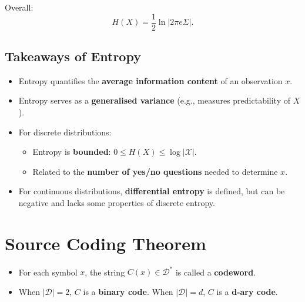 Overall:
\[
H(X) = \frac{1}{2} \ln |2 \pi e \Sigma|.
\]

\subsection{Takeaways of Entropy}
\begin{itemize}
    \item Entropy quantifies the \textbf{average information content} of an observation \(x\).
    \item Entropy serves as a \textbf{generalised variance} (e.g., measures predictability of \(X\)).
    \item For discrete distributions:
    \begin{itemize}
        \item Entropy is \textbf{bounded}: \(0 \leq H(X) \leq \log |\mathcal{X}|\).
        \item Related to the \textbf{number of yes/no questions} needed to determine \(x\).
    \end{itemize}
    \item For continuous distributions, \textbf{differential entropy} is defined, but can be negative and lacks some properties of discrete entropy.
\end{itemize}

\section{Source Coding Theorem}


\begin{itemize}
    \item For each symbol \( x \), the string \( C(x) \in \mathcal{D}^* \) is called a \textbf{codeword}.
    \item When \( |\mathcal{D}| = 2 \), \( C \) is a \textbf{binary code}. When \( |\mathcal{D}| = d \), \( C \) is a \textbf{d-ary code}.
\end{itemize}

